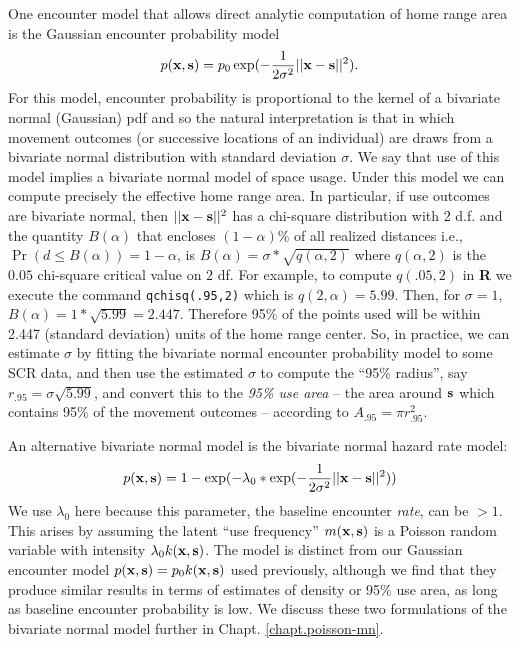 One encounter model that allows direct analytic computation
of home range area is the Gaussian encounter probability model
\[
p({\bf x},{\bf s}) = p_{0} \exp(-\frac{1}{2\sigma^2} ||{\bf x}-{\bf s}||^2).
\]
For this model, encounter probability is proportional to the kernel of
a bivariate normal (Gaussian) pdf and so the natural interpretation is
that in which movement outcomes (or successive locations of an
individual) are draws from a bivariate normal distribution with
standard deviation $\sigma$. We say that use of this model implies a 
 bivariate normal model of space usage.
Under this model we can compute precisely the effective home range
area. In particular, if use outcomes are bivariate normal, then
$||{\bf x}-{\bf s}||^2$ has a chi-square distribution with 2 d.f. and
the quantity $B(\alpha)$ that encloses $(1-\alpha)$\% of all realized
distances i.e., $\Pr(d\le B(\alpha)) = 1-\alpha$, is $B(\alpha) =
\sigma*\sqrt{q(\alpha,2)}$ where $q(\alpha,2)$ is the $0.05$
chi-square critical value on $2$ df. For example, to compute $q(.05,
2)$ in {\bf R} we execute the command \mbox{\tt qchisq(.95,2)} which
is $q(2,\alpha) = 5.99$. Then, for $\sigma=1$, $B(\alpha) =
1*\sqrt{5.99} = 2.447$.  Therefore 95\% of the points used will be
within 2.447 (standard deviation) units of the home range center. So,
in practice, we can estimate $\sigma$ by fitting the bivariate normal
encounter probability model to some SCR data, and then use the
estimated $\sigma$ to compute the ``95\% radius'', say $r_{.95} =
\sigma \sqrt{5.99}$, and convert this to the {\it 95\% use area} --
the area around ${\bf s}$ which contains 95\% of the movement outcomes
-- according to $A_{.95} = \pi r_{.95}^{2}$.

An alternative bivariate normal model is the bivariate normal hazard
rate model:
\begin{equation}
p({\bf x},{\bf s}) = 1-\exp(-\lambda_{0}*\exp(-\frac{1}{2\sigma^{2}} ||{\bf x}-{\bf s}||^2))
\label{scr0.eq.hazard}
\end{equation}
We use $\lambda_{0}$ here because this parameter, the baseline
encounter {\it rate}, can be $>1$.  This arises by assuming the latent
``use frequency'' $m({\bf x},{\bf s})$ is a Poisson random variable
with intensity $\lambda_0 k({\bf x},{\bf s})$. The model is distinct
from our Gaussian encounter model $p({\bf x},{\bf s}) = p_0 k({\bf
  x},{\bf s})$ used previously, although we find that they produce
similar results in terms of estimates of density or 95\% use area, as
long as baseline encounter probability is low.  We discuss these two
formulations of the bivariate normal model further in
Chapt. \ref{chapt.poisson-mn}.

